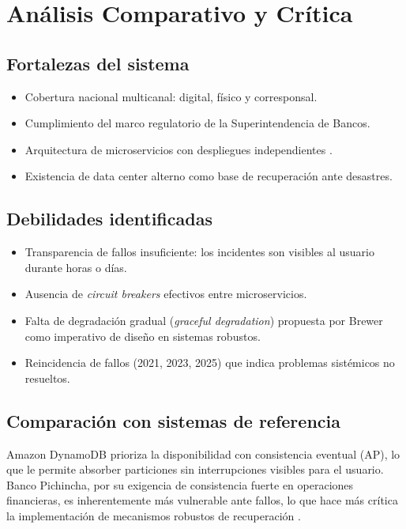 \documentclass[12pt,a4paper]{article}
\begin{document}
\section{An\'alisis Comparativo y Cr\'itica}

\subsection{Fortalezas del sistema}

\begin{itemize}[leftmargin=1.5cm, itemsep=2pt]
  \item Cobertura nacional multicanal: digital, f\'isico y corresponsal.
  \item Cumplimiento del marco regulatorio de la Superintendencia de Bancos.
  \item Arquitectura de microservicios con despliegues independientes \cite{Poniszewska2020}.
  \item Existencia de data center alterno como base de recuperaci\'on ante desastres.
\end{itemize}

\subsection{Debilidades identificadas}

\begin{itemize}[leftmargin=1.5cm, itemsep=2pt]
  \item Transparencia de fallos insuficiente: los incidentes son visibles al usuario durante horas o d\'ias.
  \item Ausencia de \textit{circuit breakers} efectivos entre microservicios.
  \item Falta de degradaci\'on gradual (\textit{graceful degradation}) propuesta por Brewer \cite{Brewer2000} como imperativo de dise\~no en sistemas robustos.
  \item Reincidencia de fallos (2021, 2023, 2025) que indica problemas sist\'emicos no resueltos.
\end{itemize}

\subsection{Comparaci\'on con sistemas de referencia}

Amazon DynamoDB prioriza la disponibilidad con consistencia eventual (AP), lo que le permite absorber particiones sin interrupciones visibles para el usuario. Banco Pichincha, por su exigencia de consistencia fuerte en operaciones financieras, es inherentemente m\'as vulnerable ante fallos, lo que hace m\'as cr\'itica la implementaci\'on de mecanismos robustos de recuperaci\'on \cite{Mickoservicesbanking2025, GilbertLynch2002}.
\end{document}
